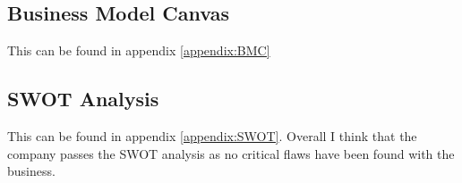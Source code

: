 \documentclass{article}[18pt]
\begin{document}
\subsection{Business Model Canvas}
This can be found in appendix \ref{appendix:BMC}
\subsection{SWOT Analysis}
This can be found in appendix \ref{appendix:SWOT}. Overall I think that the company passes the SWOT analysis as no critical flaws have been found with the business.
\end{document}

